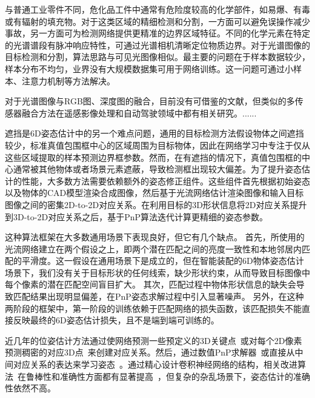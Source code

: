 \documentclass[12pt]{article}
\begin{document}
与普通工业零件不同，危化品工件中通常有危险度较高的化学部件，如易爆、有毒或有辐射的填充物。对于这类区域的精细检测和分割，一方面可以避免误操作减少事故，另一方面可为检测网络提供更精准的边界区域特征。不同的化学元素在特定的光谱谱段有脉冲响应特性，可通过光谱相机清晰定位物质边界。对于光谱图像的目标检测和分割，算法思路与可见光图像相似。最主要的问题在于样本数据较少，样本分布不均匀，业界没有大规模数据集可用于网络训练。这一问题可通过小样本\cite{lys2022targetDetection, shi2020HyperspectralTargetDetection}、注意力机制\cite{shi2020hyperspectralROI}等方法解决。

对于光谱图像与RGB图、深度图的融合，目前没有可借鉴的文献，但类似的多传感器融合方法在遥感影像处理和自动驾驶领域中都有相关研究。......


遮挡是6D姿态估计中的另一个难点问题，通用的目标检测方法假设物体之间遮挡较少，标准真值包围框中心的区域周围为目标物体，因此在网络学习中专注于仅从这些区域提取的样本预测边界框参数。然而，在有遮挡的情况下，真值包围框的中心通常被其他物体或者场景元素遮蔽，导致检测框出现较大偏差。为了提升姿态估计的性能，大多数方法需要依赖额外的姿态修正组件。这些组件首先根据初始姿态以及物体的CAD模型渲染合成图像，然后基于光流网络估计渲染图像和输入目标图像之间的密集2D-to-2D对应关系。在利用目标的3D形状信息将2D对应关系提升到3D-to-2D对应关系之后，基于PnP算法迭代计算更精细的姿态参数。

这种算法框架在大多数通用场景下表现良好，但它有几个缺点。
首先，所使用的光流网络建立在两个假设之上，即两个潜在匹配之间的亮度一致性和本地邻居内匹配的平滑度。这一假设在通用场景下是成立的，但在智能装配的6D物体姿态估计场景下，我们没有关于目标形状的任何线索，缺少形状约束，从而导致目标图像中每个像素的潜在匹配空间盲目扩大。
其次，匹配过程中物体形状信息的缺失会导致匹配结果出现明显偏差，在PnP姿态求解过程中引入显著噪声。
另外，在这种两阶段的框架中，第一阶段的训练依赖于匹配网络的损失函数，该匹配损失不能直接反映最终的6D姿态估计损失，且不是端到端可训练的。

近几年的位姿估计方法通过使网络预测一些预定义的3D关键点~\cite{rad2017bb8, hu2019segDriven, peng2019pvnet, Hu2021}或对每个2D像素预测稠密的对应3D点~\cite{zakharov2019dpod, Su2022, li2019cdpn, wang2021gdrnet, Di2021}来创建对应关系。然后，通过数值PnP求解器~\cite{lepetit2009epnp}或直接从中间对应关系的表达来学习姿态~\cite{hu2020singleStage, EroPnP,wang2021gdrnet, Di2021}。通过精心设计卷积神经网络的结构，相关改进算法~\cite{he2016resnet, resnext_2017_cvpr}在鲁棒性和准确性方面都有显著提高~\cite{Xiang2018, peng2019pvnet, wang2019densefusion60}，但复杂的杂乱场景下，姿态估计的准确性依然不高。
\end{document}
